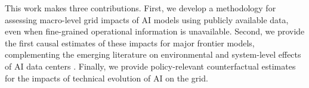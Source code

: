 \documentclass[sigconf]{acmart}
\newcommand{\aruna}[1]{\textcolor{blue}{Aruna[#1]}}
\begin{document}
This work makes three contributions. First, we develop a methodology for assessing macro-level grid impacts of AI models using publicly available data, even when fine-grained operational information is unavailable. Second, we provide the first causal estimates of these impacts for major frontier models, complementing the emerging literature on environmental and system-level effects of AI data centers \cite{murino2023sustainable, guidi2024environmental, thangam2024impact}. Finally, we provide policy-relevant counterfactual estimates for the impacts of technical evolution of AI on the grid.




\end{document}
